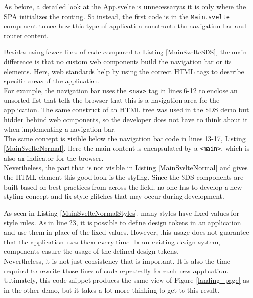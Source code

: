As before, a detailed look at the App.svelte is unnecessaryas it is only where the \ac{SPA} initializes the routing. So instead, the first code is in the \texttt{Main.svelte} component to see how this type of application constructs the navigation bar and router content. 

Besides using fewer lines of code compared to Listing \ref{MainSvelteSDS}, the main difference is that no custom web components build the navigation bar or its elements. Here, web standards help by using the correct \ac{HTML} tags to describe specific areas of the application. \\
For example, the navigation bar uses the \texttt{<nav>} tag in lines 6-12 to enclose an unsorted list that tells the browser that this is a navigation area for the application. The same construct of an \ac{HTML} tree was used in the \ac{SDS} demo but hidden behind web components, so the developer does not have to think about it when implementing a navigation bar. \\
The same concept is visible below the navigation bar code in lines 13-17, Listing \ref{MainSvelteNormal}. Here the main content is encapsulated by a \texttt{<main>}, which is also an indicator for the browser. \\
Nevertheless, the part that is not visible in Listing \ref{MainSvelteNormal} and gives the \ac{HTML} element this good look is the styling. Since the \ac{SDS} components are built based on best practices from across the field, no one has to develop a new styling concept and fix style glitches that may occur during development. 

As seen in Listing \ref{MainSvelteNormalStyles}, many styles have fixed values for style rules. As in line 23, it is possible to define design tokens in an application and use them in place of the fixed values. However, this usage does not guarantee that the application uses them every time. In an existing design system, components ensure the usage of the defined design tokens. \\
Nevertheless, it is not just consistency that is important. It is also the time required to rewrite those lines of code repeatedly for each new application. Ultimately, this code snippet produces the same view of Figure \ref{landing_page} as in the other demo, but it takes a lot more thinking to get to this result.  \\

